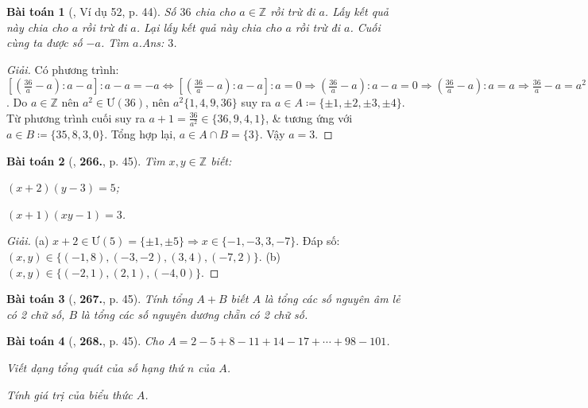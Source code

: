 \documentclass{article}
\numberwithin{equation}{section}
\newtheorem{baitoan}{Bài toán}
\begin{document}
\begin{baitoan}[\cite{Binh_Toan_6_tap_1}, Ví dụ 52, p. 44]
	Số $36$ chia cho $a\in\mathbb{Z}$ rồi trừ đi $a$. Lấy kết quả này chia cho $a$ rồi trừ đi $a$. Lại lấy kết quả này chia cho $a$ rồi trừ đi $a$. Cuối cùng ta được số $-a$. Tìm $a$.\hfill{\sf Ans:} $3$.
\end{baitoan}

\begin{proof}[Giải]
	Có phương trình: $\left[\left(\frac{36}{a} - a\right):a - a\right]:a - a = -a\Leftrightarrow\left[\left(\frac{36}{a} - a\right):a - a\right]:a = 0\Rightarrow\left(\frac{36}{a} - a\right):a - a = 0\Rightarrow\left(\frac{36}{a} - a\right):a = a\Rightarrow\frac{36}{a} - a = a^2\Rightarrow\frac{36}{a} = a^2 + a = a(a + 1)\Rightarrow36 = a^2(a + 1)$. Do $a\in\mathbb{Z}$ nên $a^2\in\mbox{Ư}(36)$, nên $a^2\{1,4,9,36\}$ suy ra $a\in A\coloneqq\{\pm1,\pm2,\pm3,\pm4\}$. Từ phương trình cuối suy ra $a + 1 = \frac{36}{a^2}\in\{36,9,4,1\}$, \& tương ứng với $a\in B\coloneqq\{35,8,3,0\}$. Tổng hợp lại, $a\in A\cap B = \{3\}$. Vậy $a = 3$.
\end{proof}

\begin{baitoan}[\cite{Binh_Toan_6_tap_1}, \textbf{266.}, p. 45]
	Tìm $x,y\in\mathbb{Z}$ biết:
	\begin{enumerate*}
		\item[(a)] $(x + 2)(y - 3) = 5$;
		\item[(b)] $(x + 1)(xy - 1) = 3$.
	\end{enumerate*}
\end{baitoan}

\begin{proof}[Giải]
	(a) $x + 2\in\mbox{Ư}(5) = \{\pm1,\pm5\}\Rightarrow x\in\{-1,-3,3,-7\}$. Đáp số: $(x,y)\in\{(-1,8),(-3,-2),(3,4),(-7,2)\}$. (b) $(x,y)\in\{(-2,1),(2,1),(-4,0)\}$.
\end{proof}

\begin{baitoan}[\cite{Binh_Toan_6_tap_1}, \textbf{267.}, p. 45]
	Tính tổng $A + B$ biết $A$ là tổng các số nguyên âm lẻ có 2 chữ số, $B$ là tổng các số nguyên dương chẵn có 2 chữ số.
\end{baitoan}

\begin{baitoan}[\cite{Binh_Toan_6_tap_1}, \textbf{268.}, p. 45]
	Cho $A = 2 - 5 + 8 - 11 + 14 - 17 + \cdots + 98 - 101$.
	\begin{enumerate*}
		\item[(a)] Viết dạng tổng quát của số hạng thứ $n$ của $A$.
		\item[(b)] Tính giá trị của biểu thức $A$.
	\end{enumerate*}
\end{baitoan}
\end{document}
